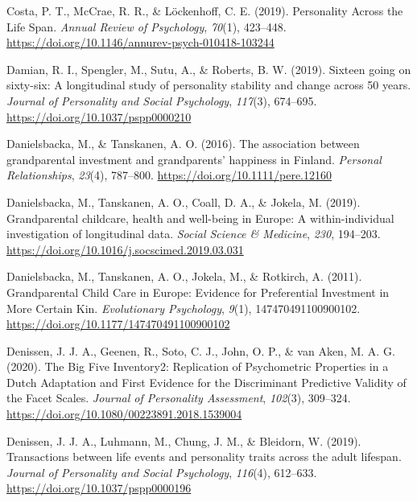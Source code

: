 \documentclass[
  english,
  man, noextraspace]{apa7}
\begin{document}
\leavevmode\hypertarget{ref-costaPersonalityLifeSpan2019}{}%
Costa, P. T., McCrae, R. R., \& Löckenhoff, C. E. (2019). Personality Across the Life Span. \emph{Annual Review of Psychology}, \emph{70}(1), 423--448. \url{https://doi.org/10.1146/annurev-psych-010418-103244}

\leavevmode\hypertarget{ref-damianSixteenGoingSixtysix2019}{}%
Damian, R. I., Spengler, M., Sutu, A., \& Roberts, B. W. (2019). Sixteen going on sixty-six: A longitudinal study of personality stability and change across 50 years. \emph{Journal of Personality and Social Psychology}, \emph{117}(3), 674--695. \url{https://doi.org/10.1037/pspp0000210}

\leavevmode\hypertarget{ref-danielsbackaAssociationGrandparentalInvestment2016}{}%
Danielsbacka, M., \& Tanskanen, A. O. (2016). The association between grandparental investment and grandparents' happiness in Finland. \emph{Personal Relationships}, \emph{23}(4), 787--800. \url{https://doi.org/10.1111/pere.12160}

\leavevmode\hypertarget{ref-danielsbackaGrandparentalChildcareHealth2019}{}%
Danielsbacka, M., Tanskanen, A. O., Coall, D. A., \& Jokela, M. (2019). Grandparental childcare, health and well-being in Europe: A within-individual investigation of longitudinal data. \emph{Social Science \& Medicine}, \emph{230}, 194--203. \url{https://doi.org/10.1016/j.socscimed.2019.03.031}

\leavevmode\hypertarget{ref-danielsbackaGrandparentalChildCare2011}{}%
Danielsbacka, M., Tanskanen, A. O., Jokela, M., \& Rotkirch, A. (2011). Grandparental Child Care in Europe: Evidence for Preferential Investment in More Certain Kin. \emph{Evolutionary Psychology}, \emph{9}(1), 147470491100900102. \url{https://doi.org/10.1177/147470491100900102}

\leavevmode\hypertarget{ref-denissenBigFiveInventory2020}{}%
Denissen, J. J. A., Geenen, R., Soto, C. J., John, O. P., \& van Aken, M. A. G. (2020). The Big Five Inventory2: Replication of Psychometric Properties in a Dutch Adaptation and First Evidence for the Discriminant Predictive Validity of the Facet Scales. \emph{Journal of Personality Assessment}, \emph{102}(3), 309--324. \url{https://doi.org/10.1080/00223891.2018.1539004}

\leavevmode\hypertarget{ref-denissenTransactionsLifeEvents2019}{}%
Denissen, J. J. A., Luhmann, M., Chung, J. M., \& Bleidorn, W. (2019). Transactions between life events and personality traits across the adult lifespan. \emph{Journal of Personality and Social Psychology}, \emph{116}(4), 612--633. \url{https://doi.org/10.1037/pspp0000196}
\end{document}
